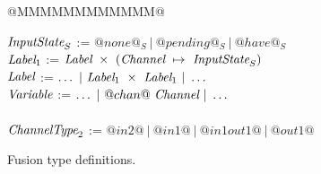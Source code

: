 
\begin{figure}

\begin{tabbing}
@MMMMMMMMMMMM@   \TABDEF \kill

$\textit{InputState}_S$ \> := \> $@none@_S ~|~ @pending@_S ~|~ @have@_S$
\\
$\textit{Label}_1$ \> := \> $\textit{Label}~\times~(\textit{Channel} ~\mapsto~ \textit{InputState}_S)$ \\
$\textit{Label}$   \> := \> $\ldots ~|~\textit{Label}_1~\times~\textit{Label}_1 ~|~ \ldots$ \\
$\textit{Variable}$     \> := \> $\ldots ~|~@chan@~\textit{Channel} ~|~ \ldots$ \\
\\

$\textit{ChannelType}_2$   \> := \> $@in2@~|~@in1@~|~@in1out1@~|~@out1@$
\end{tabbing}

\caption{Fusion type definitions.}
\label{fig:Fusion:Types}
\end{figure}


